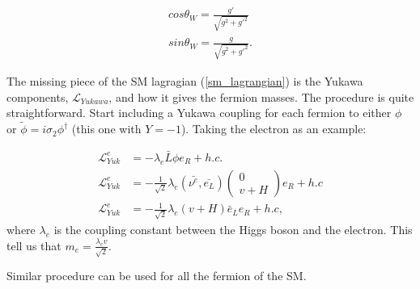 \begin{equation}
    \begin{split}
        cos \theta_W = \frac{g'}{\sqrt{g^2+g'^2}} \\ 
        sin \theta_W = \frac{g}{\sqrt{g^2+g'^2}}.
    \end{split}
    \label{weinberg_angles}
\end{equation}

The missing piece of the SM lagragian (\ref{sm_lagrangian}) is the Yukawa components, $\mathcal{L}_{Yukawa}$, and how it gives the fermion masses. The procedure is quite straightforward. Start including a Yukawa coupling for each fermion to either $\phi$ or $\tilde{\phi} =i \sigma_2 \phi^\dagger$ (this one with $Y=-1$). Taking the electron as an example:

\begin{equation}
    \begin{split}
        \mathcal{L}_{Yuk}^e &= -\lambda_e \bar{L} \phi e_R + h.c. \\
        \mathcal{L}_{Yuk}^e &= -\frac{1}{\sqrt{2}} \lambda_e (\bar{\nu^e}, \bar{e_L}) \left ( 
            \begin{matrix}
            0 \\
            v + H
            \end{matrix}
            \right )
            e_R + h.c \\ 
        \mathcal{L}_{Yuk}^e &= -\frac{1}{\sqrt{2}} \lambda_e  (v+H) \bar{e}_Le_R + h.c,
    \end{split}
    \label{fermion_mass}
\end{equation}
where $\lambda_e$ is the coupling constant between the Higgs boson and the electron. This tell us that $m_e = \frac{\lambda_e v}{\sqrt{2}}$.

Similar procedure can be used for all the fermion of the SM. 
